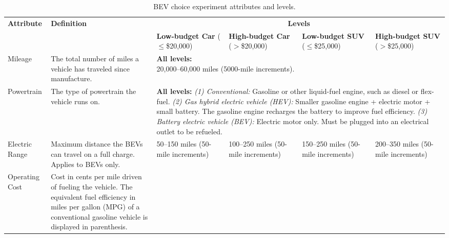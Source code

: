 \begin{table}[pos=H]
\caption{BEV choice experiment attributes and levels.}
\label{table:dce_attributes}
\begin{adjustbox}{width=\textwidth, center}
{\renewcommand{\arraystretch}{1.4}
\begin{tabular}{p{3.2cm} p{4.8cm} p{3cm} p{3cm} p{3cm} p{3cm}}
\toprule
\multirow{2}{*}{\textbf{Attribute}} & \multirow{2}{*}{\textbf{Definition}} & \multicolumn{4}{c}{\textbf{Levels}} \\
\cmidrule(lr){3-6}
 & & \textbf{Low-budget Car} \newline ($\leq$\$20,000) & \textbf{High-budget Car} \newline ($>$\$20,000) & \textbf{Low-budget SUV} \newline ($\leq$\$25,000) & \textbf{High-budget SUV} \newline ($>$\$25,000) \\
\midrule
Mileage & The total number of miles a vehicle has traveled since manufacture. & \multicolumn{4}{p{12.5cm}}{\textbf{All levels:} \newline20,000--60,000 miles (5000-mile increments).} \\
\addlinespace[4pt]
Powertrain & The type of powertrain the vehicle runs on. & \multicolumn{4}{p{12.5cm}}{%
  \textbf{All levels:} \newline
  \textit{(1) Conventional:} Gasoline or other liquid-fuel engine, such as diesel or flex-fuel.\newline
  \textit{(2) Gas hybrid electric vehicle (HEV):} Smaller gasoline engine + electric motor + small battery. The gasoline engine recharges the battery to improve fuel efficiency.\newline
  \textit{(3) Battery electric vehicle (BEV):} Electric motor only. Must be plugged into an electrical outlet to be refueled.} \\
\addlinespace[4pt]
Electric Range & Maximum distance the BEVs can travel on a full charge. Applies to BEVs only. & 50--150 miles \newline (50-mile increments) & 100--250 miles \newline (50-mile increments) & 150--250 miles \newline (50-mile increments) & 200--350 miles \newline (50-mile increments) \\
\addlinespace[4pt]
Operating Cost & Cost in cents per mile driven of fueling the vehicle. The equivalent fuel efficiency in miles per gallon (MPG) of a conventional gasoline vehicle is displayed in parenthesis. & \multicolumn{2}{p{6cm}}{%
}
\end{tabular}}
\end{adjustbox}
\end{table}
